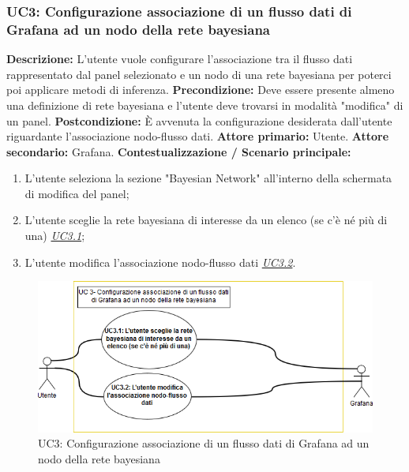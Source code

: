     
                        
                \subsubsection{UC3: Configurazione associazione di un flusso dati di Grafana ad un nodo della rete bayesiana}
                    \textbf{Descrizione:} L’utente vuole configurare l'associazione tra il flusso dati rappresentato dal panel selezionato e un nodo di una rete bayesiana per poterci poi applicare metodi di inferenza.
                    \newline
                    \textbf{Precondizione:} Deve essere presente almeno una definizione di rete bayesiana e l'utente deve trovarsi in modalità "modifica" di un panel.
                    \newline
                    \textbf{Postcondizione:} \`E avvenuta la configurazione desiderata dall'utente riguardante l'associazione nodo-flusso dati.
                    \newline
                    \textbf{Attore primario:} Utente.
                    \newline
                    \textbf{Attore secondario:} Grafana.
                    \newline
                    \textbf{Contestualizzazione / Scenario principale:} \begin{enumerate}
                        \item L’utente seleziona la sezione "Bayesian Network" all'interno della schermata di modifica del panel;
                        \item L'utente sceglie la rete bayesiana di interesse da un elenco (se c'è né più di una) \underline{\textit{UC3.1}};
                        \item L'utente modifica l'associazione nodo-flusso dati \underline{\textit{UC3.2}}.
                    \end{enumerate}
                    
                    \begin{figure}[!htbp]
                    	\centering
                    	\includegraphics[width=\textwidth]{UC3.png}
                    	\caption{UC3: Configurazione associazione di un flusso dati di Grafana ad un nodo della rete bayesiana}
                    	\label{uc3}
                    \end{figure}
                    
